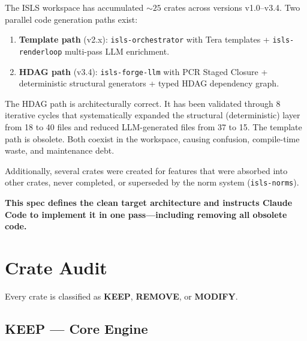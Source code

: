 \documentclass[11pt,a4paper]{article}
\begin{document}
The ISLS workspace has accumulated ${\sim}25$ crates across versions v1.0--v3.4.
Two parallel code generation paths exist:

\begin{enumerate}
\item \textbf{Template path} (v2.x): \texttt{isls-orchestrator} with Tera templates + \texttt{isls-renderloop} multi-pass LLM enrichment.
\item \textbf{HDAG path} (v3.4): \texttt{isls-forge-llm} with PCR Staged Closure + deterministic structural generators + typed HDAG dependency graph.
\end{enumerate}

The HDAG path is architecturally correct. It has been validated through 8 iterative
cycles that systematically expanded the structural (deterministic) layer from 18 to 40
files and reduced LLM-generated files from 37 to 15. The template path is obsolete.
Both coexist in the workspace, causing confusion, compile-time waste, and maintenance debt.

Additionally, several crates were created for features that were absorbed into other crates,
never completed, or superseded by the norm system (\texttt{isls-norms}).

\textbf{This spec defines the clean target architecture and instructs Claude Code to
implement it in one pass---including removing all obsolete code.}

\section{Crate Audit}

Every crate is classified as \textcolor{keepgreen}{\textbf{KEEP}},
\textcolor{removered}{\textbf{REMOVE}}, or
\textcolor{modifyamber}{\textbf{MODIFY}}.

\subsection{KEEP --- Core Engine}
\end{document}

